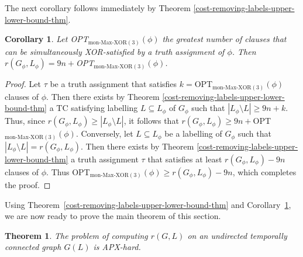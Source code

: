 \documentclass[a4paper,UKenglish]{article}
\newtheorem{theorem}{Theorem}
\newtheorem{corollary}{Corollary}
\begin{document}
The next corollary follows immediately by Theorem \ref {cost-removing-labels-upper-lower-bound-thm}.

\begin{corollary}
\label{cost-removing-labels-cor}Let OPT$_{\text{mon-Max-XOR}(3)}(\phi )$ the
greatest number of clauses that can be simultaneously XOR-satisfied by a
truth assignment of $\phi $. Then $r(G_{\phi },L_{\phi })=9n+$OPT$_{\text{mon-Max-XOR}(3)}(\phi )$.
\end{corollary}

\begin{proof}
Let $\tau $ be a truth assignment that satisfies $k=$OPT$_{\text{mon-Max-XOR}(3)}(\phi )$ clauses of $\phi $. Then there exists by Theorem \ref {cost-removing-labels-upper-lower-bound-thm} a TC satisfying labelling $L\subseteq L_{\phi }
$ of $G_{\phi }$ such that $|L_{\phi }\setminus L|\geq 9n+k$. Thus, since $r(G_{\phi },L_{\phi })\geq |L_{\phi }\setminus L|$, it follows that $r(G_{\phi },L_{\phi })\geq 9n+$OPT$_{\text{mon-Max-XOR}(3)}(\phi )$.
Conversely, let $L\subseteq L_{\phi }$ be a labelling of $G_{\phi }$ such
that $|L_{\phi }\setminus L|=r(G_{\phi },L_{\phi })$. Then there exists by
Theorem \ref{cost-removing-labels-upper-lower-bound-thm} a truth assignment $\tau $ that satisfies at least $r(G_{\phi },L_{\phi })-9n$ clauses of $\phi $. Thus OPT$_{\text{mon-Max-XOR}(3)}(\phi )\geq r(G_{\phi },L_{\phi })-9n$,
which completes the proof.
\end{proof}

Using Theorem~\ref{cost-removing-labels-upper-lower-bound-thm} and Corollary~\ref{cost-removing-labels-cor}, we are now
ready to prove the main theorem of this section.



\begin{theorem}
\label{cost-removing-labels-APX-hard-thm}The problem of computing $r(G,L)$ on an undirected temporally connected graph $G(L)$ is APX-hard.
\end{theorem}
\end{document}
